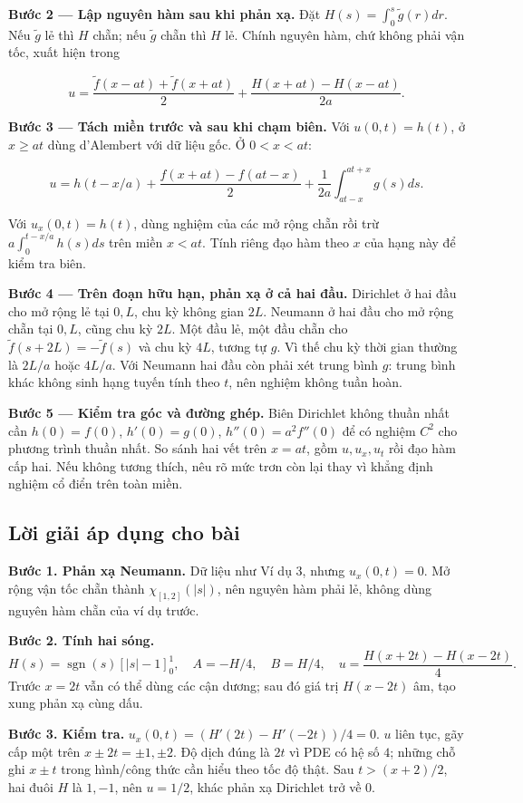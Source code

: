 \documentclass[10pt,a4paper]{article}
\begin{document}
\textbf{Bước 2 — Lập nguyên hàm sau khi phản xạ.} Đặt $H(s)=\int_0^s\widetilde g(r)dr$. Nếu $\widetilde g$ lẻ thì $H$ chẵn; nếu $\widetilde g$ chẵn thì $H$ lẻ. Chính nguyên hàm, chứ không phải vận tốc, xuất hiện trong


\[
u=\frac{\widetilde f(x-at)+\widetilde f(x+at)}2+\frac{H(x+at)-H(x-at)}{2a}.
\]


\textbf{Bước 3 — Tách miền trước và sau khi chạm biên.} Với $u(0,t)=h(t)$, ở $x\ge at$ dùng d'Alembert với dữ liệu gốc. Ở $0<x<at$:


\[
u=h(t-x/a)+\frac{f(x+at)-f(at-x)}2+\frac1{2a}\int_{at-x}^{at+x}g(s)ds.
\]


Với $u_x(0,t)=h(t)$, dùng nghiệm của các mở rộng chẵn rồi trừ $a\int_0^{t-x/a}h(s)ds$ trên miền $x<at$. Tính riêng đạo hàm theo $x$ của hạng này để kiểm tra biên.

\textbf{Bước 4 — Trên đoạn hữu hạn, phản xạ ở cả hai đầu.} Dirichlet ở hai đầu cho mở rộng lẻ tại $0,L$, chu kỳ không gian $2L$. Neumann ở hai đầu cho mở rộng chẵn tại $0,L$, cũng chu kỳ $2L$. Một đầu lẻ, một đầu chẵn cho $\widetilde f(s+2L)=-\widetilde f(s)$ và chu kỳ $4L$, tương tự $g$. Vì thế chu kỳ thời gian thường là $2L/a$ hoặc $4L/a$. Với Neumann hai đầu còn phải xét trung bình $g$: trung bình khác không sinh hạng tuyến tính theo $t$, nên nghiệm không tuần hoàn.

\textbf{Bước 5 — Kiểm tra góc và đường ghép.} Biên Dirichlet không thuần nhất cần $h(0)=f(0)$, $h'(0)=g(0)$, $h''(0)=a^2f''(0)$ để có nghiệm $C^2$ cho phương trình thuần nhất. So sánh hai vết trên $x=at$, gồm $u,u_x,u_t$ rồi đạo hàm cấp hai. Nếu không tương thích, nêu rõ mức trơn còn lại thay vì khẳng định nghiệm cổ điển trên toàn miền.
\subsection*{Lời giải áp dụng cho bài}
\textbf{Bước 1. Phản xạ Neumann.} Dữ liệu như Ví dụ 3, nhưng $u_x(0,t)=0$. Mở rộng vận tốc chẵn thành $\chi_{[1,2]}(|s|)$, nên nguyên hàm phải lẻ, không dùng nguyên hàm chẵn của ví dụ trước.

\textbf{Bước 2. Tính hai sóng.}
\[H(s)=\operatorname{sgn}(s)[|s|-1]_0^1,\quad A=-H/4,\quad B=H/4,\quad u=\frac{H(x+2t)-H(x-2t)}4.\]
Trước $x=2t$ vẫn có thể dùng các cận dương; sau đó giá trị $H(x-2t)$ âm, tạo xung phản xạ cùng dấu.

\textbf{Bước 3. Kiểm tra.} $u_x(0,t)=(H'(2t)-H'(-2t))/4=0$. $u$ liên tục, gãy cấp một trên $x\pm2t=\pm1,\pm2$. Độ dịch đúng là $2t$ vì PDE có hệ số $4$; những chỗ ghi $x\pm t$ trong hình/công thức cần hiểu theo tốc độ thật. Sau $t>(x+2)/2$, hai đuôi $H$ là $1,-1$, nên $u=1/2$, khác phản xạ Dirichlet trở về $0$.
\end{document}
